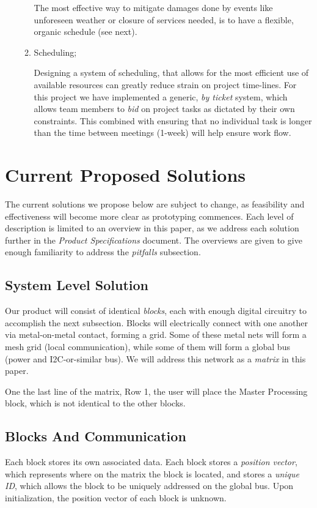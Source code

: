 \begin{enumerate}
\begin{enumerate}
  The most effective way to mitigate damages done by events like unforeseen weather or closure of services needed, is to have a flexible, organic schedule (see next).
  \item Scheduling;

  Designing a system of scheduling, that allows for the most efficient use of available resources can greatly reduce strain on project time-lines. For this project we have implemented a generic, \textit{by ticket} system, which allows team members to \textit{bid} on project tasks as dictated by their own constraints. This combined with ensuring that no individual task is longer than the time between meetings (1-week) will help ensure work flow.
  \end{enumerate}
  \end{enumerate}

\section{Current Proposed Solutions}
  The current solutions we propose below are subject to change, as feasibility and effectiveness will become more clear as prototyping commences. Each level of description is limited to an overview in this paper, as we address each solution further in the \textit{Product  Specifications} document. The overviews are given to give enough familiarity to address the \textit{pitfalls} subsection.
  \subsection{System Level Solution}
    Our product will consist of identical \textit{blocks}, each with enough digital circuitry to accomplish the next subsection. Blocks will electrically connect with one another via metal-on-metal contact, forming a grid. Some of these metal nets will form a mesh grid (local communication), while some of them will form a global bus (power and I2C-or-similar bus). We will address this network as a \textit{matrix} in this paper.

    One the last line of the matrix, Row 1, the user will place the Master Processing block, which is not identical to the other blocks.
  \subsection{Blocks And Communication}
    Each block stores its own associated data. Each block stores a \textit{position vector}, which represents where on the matrix the block is located, and stores a \textit{unique ID}, which allows the block to be uniquely addressed on the global bus. Upon initialization, the position vector of each block is unknown.
